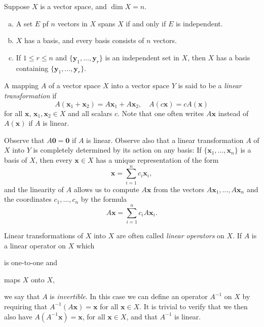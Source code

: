 \begin{thm}
    \label{thm:9.3}
    Suppose $X$ is a vector space, and $\dim X = n$.
    \begin{enumerate}[(a)]
        \item A set $E$ pf $n$ vectors in $X$ spans $X$ if and only if $E$ is independent.
        \item $X$ has a basis, and every basis consists of $n$ vectors.
        \item If $1 \leq r \leq n$ and $\{\mathbf{y}_1, \dots , \mathbf{y}_r\}$ is an independent set in $X$, then $X$ has a basis containing $\{\mathbf{y}_1, \dots , \mathbf{y}_r\}$.
    \end{enumerate}
\end{thm}


\begin{mydef}
    A mapping $A$ of a vector space $X$ into a vector space $Y$ is said to be a \emph{linear transformation} if 
    \begin{equation*}
        A(\mathbf{x}_1 + \mathbf{x}_2) =
        A\mathbf{x}_1 + A\mathbf{x}_2 ,
        \quad
        A(c\mathbf{x}) = 
        cA(\mathbf{x})
    \end{equation*}
    for all $\mathbf{x}$, $\mathbf{x}_1, \mathbf{x}_2 \in X$ and all scalars $c$.
    Note that one often writes $A \mathbf{x}$ instead of $A(\mathbf{x})$ if $A$ is linear.

    Observe that $A \mathbf{0} = \mathbf{0}$ if $A$ is linear.
    Observe also that a linear transformation $A$ of $X$ into $Y$ is completely determined by its action on any basis:
    If $\{\mathbf{x}_1, \dots , \mathbf{x}_n\}$ is a basis of $X$,
    then every $\mathbf{x} \in X$ has a unique representation of the form 
    \begin{equation*}
        \mathbf{x} = \sum_{i=1}^{n} c_i \mathbf{x}_i ,
    \end{equation*}
    and the linearity of $A$ allows us to compute $A \mathbf{x}$ from the vectors $A \mathbf{x}_1, \dots , A \mathbf{x}_n$ and the coordinates $c_1, \dots, c_n$ by the formula 
    \begin{equation*}
        A \mathbf{x} = \sum_{i=1}^{n} c_i A \mathbf{x}_i .
    \end{equation*}

    Linear transformations of $X$ into $X$ are often called \emph{linear operators} on $X$.
    If $A$ is a linear operator on $X$ which 
    \begin{inparaenum}[(i)]
        \item is one-to-one and 
        \item maps $X$ onto $X$,
    \end{inparaenum}
    we say that $A$ is \emph{invertible}.
    In this case we can define an operator $A^{-1}$ on $X$ by requiring that $A^{-1}(A \mathbf{x}) = \mathbf{x}$ for all $\mathbf{x} \in X$.
    It is trivial to verify that we then also have $A(A^{-1}\mathbf{x}) = \mathbf{x}$, for all $\mathbf{x} \in X$, and that $A^{-1}$ is linear.
\end{mydef}

